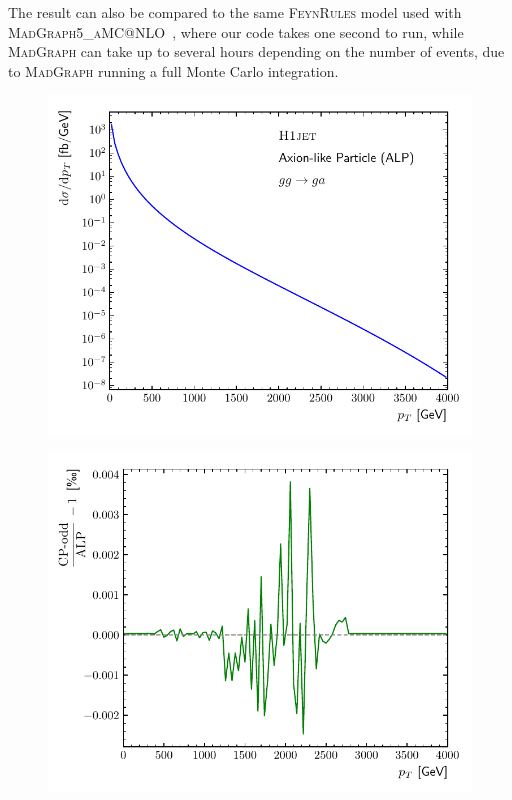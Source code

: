 \documentclass[12pt,a4wide]{article}
\begin{document}
The result can also be compared to the same \textsc{FeynRules} model
used with \textsc{MadGraph5\_aMC@NLO}~\cite{Alwall:2014hca}, where our
code takes one second to run, while \textsc{MadGraph} can take up to
several hours depending on the number of events, due to
\textsc{MadGraph} running a full Monte Carlo integration.
\begin{figure}[tbh] 
\centering
\begin{minipage}{.485\textwidth}
  \centering
  \includegraphics[width=\linewidth]{figures/ALPresult}
  \label{fig:alpresult}
\end{minipage}%
\hfill%
\begin{minipage}{.485\textwidth}
  \centering
  \includegraphics[width=\linewidth]{figures/ALPratio}
  \label{fig:alpratio}
\end{minipage}
\end{figure}
\end{document}
